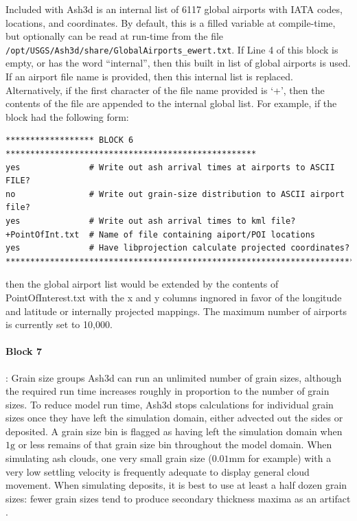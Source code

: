 Included with Ash3d is an internal list of 6117 global airports with IATA codes,
locations, and coordinates.  By default, this is a filled variable at compile-time,
but optionally can be read at run-time from the
file \texttt{/opt/USGS/Ash3d/share/GlobalAirports\_ewert.txt}.  If Line 4 of this
block is empty, or has the word ``internal'', then this built in list of global
airports is used.  If an airport file name is provided, then this internal list
is replaced.  Alternatively, if the first character of the file name provided is
`+', then the contents of the file are appended to the internal global list.  For
example, if the block had the following form:
\small
\begin{verbatim}
****************** BLOCK 6 ***************************************************
yes              # Write out ash arrival times at airports to ASCII FILE?
no               # Write out grain-size distribution to ASCII airport file?
yes              # Write out ash arrival times to kml file?
+PointOfInt.txt  # Name of file containing aiport/POI locations
yes              # Have libprojection calculate projected coordinates?
*******************************************************************************
\end{verbatim}
\normalsize
then the global airport list would be extended by the contents of PointOfInterest.txt
with the x and y columns ingnored in favor of the longitude and latitude or
internally projected mappings.  The maximum number of airports is currently set
to 10,000.

\paragraph{Block 7}: Grain size groups
Ash3d can run an unlimited number of grain sizes, although the required run time
increases roughly in proportion to the number of grain sizes. To reduce model run
time, Ash3d stops calculations for individual grain sizes once they have left the
simulation domain, either advected out the sides or deposited.  A grain size bin is
flagged as having left the simulation domain when $1 \mathrm{g}$ or less remains of
that grain size bin throughout the model domain.
When simulating ash clouds, one very small grain size ($0.01 \mathrm{mm}$ for
example) with a
very low settling velocity is frequently adequate to display general cloud movement.
When simulating deposits, it is best to use at least a half dozen grain sizes: fewer
grain sizes tend to produce secondary thickness maxima as an artifact
\cite{Mastin12}.


